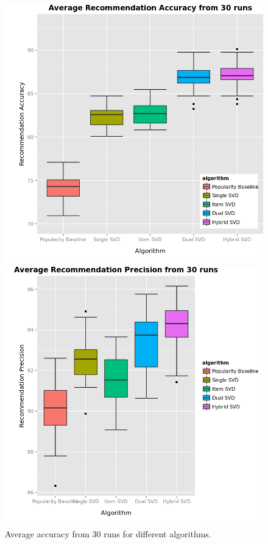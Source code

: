 \begin{figure}[!tbp]
  \centering
  \begin{minipage}[b]{0.45\textwidth}
    \includegraphics[width=\textwidth]{recent_images/accuracy.png}
    \caption{Average accuracy from 30 runs for different algorithms.}
    \label{fig:accuracy}
  \end{minipage}
  \hfill
  \begin{minipage}[b]{0.45\textwidth}
    \includegraphics[width=\textwidth]{recent_images/precision.png}

\end{minipage}
\end{figure}
